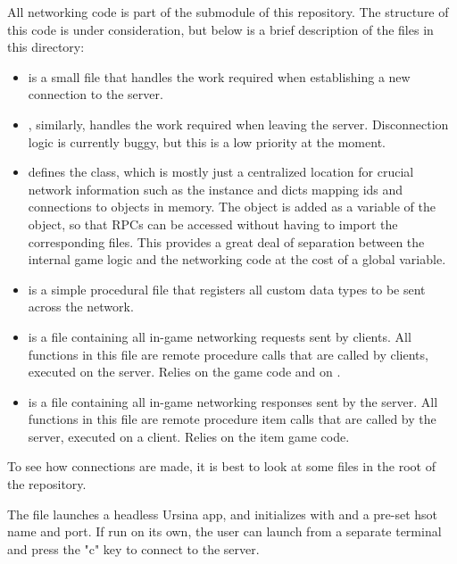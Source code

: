 \documentclass{article}
\begin{document}
All networking code is part of the  submodule of this
repository. The structure of this code is under consideration, but below is a
brief description of the files in this directory:
\begin{itemize}
    \item {} is a small file that handles the work required
        when establishing a new connection to the server.
    \item {}, similarly, handles the work required when
        leaving the server. Disconnection logic is currently buggy, but this
        is a low priority at the moment.
    \item {} defines the  class, which is
        mostly just a centralized location for crucial network information
        such as the  instance and dicts mapping ids and connections
        to objects in memory. The  object is added as a
        variable of the  object, so that RPCs can be accessed
        without having to import the corresponding files. This provides a great
        deal of separation between the internal game logic and the networking
        code at the cost of a global variable.
    \item {} is a simple procedural file that registers all
        custom data types to be sent across the network.
    \item {} is a file containing all in-game networking
        requests sent by clients. All functions in this file are remote procedure
        calls that are called by clients, executed on the server. Relies on the
        game code and on .
    \item {} is a file containing all in-game networking
        responses sent by the server. All functions in this file are remote procedure
        item calls that are called by the server, executed on a client. Relies on the
        item game code.
\end{itemize}
To see how connections are made, it is best to look at some files in the root of the
repository.

The file  launches a headless Ursina app, and initializes
 with  and a pre-set hsot name and port.
If run on its own, the user can launch  from a separate
terminal and press the "c" key to connect to the server.
\end{document}
